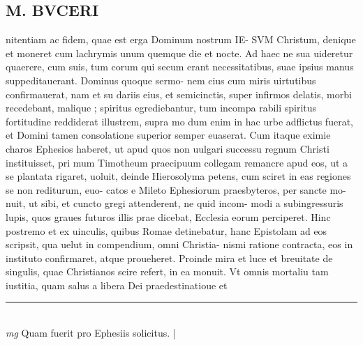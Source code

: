 \documentclass{article}
\begin{document}
\begin{pages}
\section*{M. BVCERI }\pstart nitentiam ac fidem, quae est erga Dominum nostrum IE- SVM Christum, denique  et moneret cum lachrymis unum quemque  die et nocte. Ad haec ne sua uideretur quaerere, cum suis, tum corum qui secum erant necessitatibus, suae ipsius manus suppeditauerant. Dominus quoque  sermo- nem cius cum miris uirtutibus confirmauerat, nam et su dariis eius, et semicinctis, super infirmos delatis, morbi recedebant, malique ; spiritus egrediebantur, tum incompa rabili spiritus fortitudine reddiderat illustrem, supra mo dum enim in hac urbe adflictus fuerat, et Domini tamen consolatione superior semper euaserat.   \pend\pstart Cum itaque  eximie charos Ephesios haberet, ut apud quos non uulgari successu regnum Christi instituisset, pri mum Timotheum praecipuum collegam remancre apud eos, ut a se plantata rigaret, uoluit, deinde Hierosolyma petens, cum sciret in eas regiones se non rediturum, euo- catos e Mileto Ephesiorum praesbyteros, per sancte mo- nuit, ut sibi, et cuncto gregi attenderent, ne quid incom- modi a subingressuris lupis, quos graues futuros illis prae dicebat, Ecclesia eorum perciperet.  Hinc postremo et ex uinculis, quibus Romae detinebatur, hanc Epistolam ad eos scripsit, qua uelut in compendium, omni Christia- nismi ratione contracta, eos in instituto confirmaret, atque  proueheret.   \pend\pstart Proinde mira et luce et breuitate de singulis, quae Christianos scire refert, in ea monuit.  Vt omnis mortaliu tam iustitia, quam salus a libera Dei praedestinatioue et  \pend
\vspace{0.5cm}\noindent
\vspace{0.2cm}\rule{1cm}{0.2pt}\\ 
\hspace{0.2cm}\textit{mg}
\footnotesize Quam fuerit pro Ephesiis solicitus.  
\normalsize| 

\end{pages}
\end{document}
